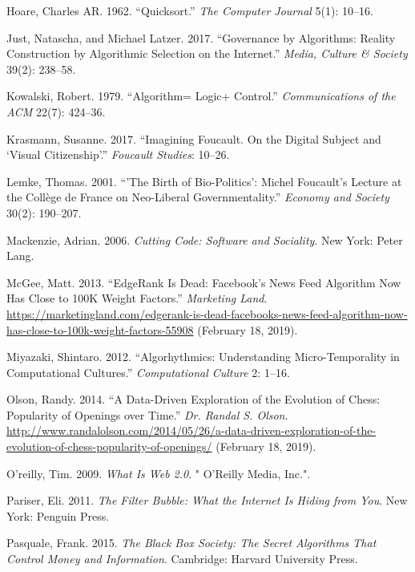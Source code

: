 \documentclass[12pt,twoside]{report}
\begin{document}
\leavevmode\hypertarget{ref-Hoare1962}{}%
Hoare, Charles AR. 1962. ``Quicksort.'' \emph{The Computer Journal} 5(1): 10--16.

\leavevmode\hypertarget{ref-Just2017}{}%
Just, Natascha, and Michael Latzer. 2017. ``Governance by Algorithms: Reality Construction by Algorithmic Selection on the Internet.'' \emph{Media, Culture \& Society} 39(2): 238--58.

\leavevmode\hypertarget{ref-Kowalski1979}{}%
Kowalski, Robert. 1979. ``Algorithm= Logic+ Control.'' \emph{Communications of the ACM} 22(7): 424--36.

\leavevmode\hypertarget{ref-Krasmann2017}{}%
Krasmann, Susanne. 2017. ``Imagining Foucault. On the Digital Subject and `Visual Citizenship'.'' \emph{Foucault Studies}: 10--26.

\leavevmode\hypertarget{ref-Lemke2001}{}%
Lemke, Thomas. 2001. ``'The Birth of Bio-Politics': Michel Foucault's Lecture at the Collège de France on Neo-Liberal Governmentality.'' \emph{Economy and Society} 30(2): 190--207.

\leavevmode\hypertarget{ref-Mackenzie2006}{}%
Mackenzie, Adrian. 2006. \emph{Cutting Code: Software and Sociality}. New York: Peter Lang.

\leavevmode\hypertarget{ref-McGee2013}{}%
McGee, Matt. 2013. ``EdgeRank Is Dead: Facebook's News Feed Algorithm Now Has Close to 100K Weight Factors.'' \emph{Marketing Land}. \url{https://marketingland.com/edgerank-is-dead-facebooks-news-feed-algorithm-now-has-close-to-100k-weight-factors-55908} (February 18, 2019).

\leavevmode\hypertarget{ref-Miyazaki2012}{}%
Miyazaki, Shintaro. 2012. ``Algorhythmics: Understanding Micro-Temporality in Computational Cultures.'' \emph{Computational Culture} 2: 1--16.

\leavevmode\hypertarget{ref-Olson2014}{}%
Olson, Randy. 2014. ``A Data-Driven Exploration of the Evolution of Chess: Popularity of Openings over Time.'' \emph{Dr. Randal S. Olson}. \url{http://www.randalolson.com/2014/05/26/a-data-driven-exploration-of-the-evolution-of-chess-popularity-of-openings/} (February 18, 2019).

\leavevmode\hypertarget{ref-Oreilly2009}{}%
O'reilly, Tim. 2009. \emph{What Is Web 2.0}. " O'Reilly Media, Inc.".

\leavevmode\hypertarget{ref-Pariser2011}{}%
Pariser, Eli. 2011. \emph{The Filter Bubble: What the Internet Is Hiding from You}. New York: Penguin Press.

\leavevmode\hypertarget{ref-Pasquale2015}{}%
Pasquale, Frank. 2015. \emph{The Black Box Society: The Secret Algorithms That Control Money and Information}. Cambridge: Harvard University Press.
\end{document}
